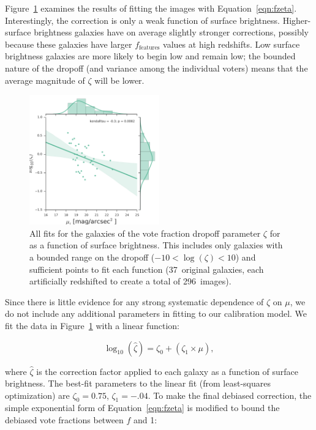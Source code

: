 \documentclass[twocolumn]{aastex6}
\begin{document}
Figure~\ref{fig:zeta_mu} examines the results of fitting the \ferengi{} images
with Equation~\ref{eqn:fzeta}. Interestingly, the correction is only a weak
function of surface brightness. Higher-surface brightness galaxies have on
average slightly stronger corrections, possibly because these galaxies have
larger $f_\textrm{features}$ values at high redshifts. Low surface brightness
galaxies are more likely to begin low and remain low; the bounded nature of the
dropoff (and variance among the individual voters) means that the average
magnitude of $\zeta$ will be lower. 

\begin{figure}
\center
\includegraphics[width=0.50\textwidth]{figures/zeta_mu.pdf}
\caption{All fits for the \ferengi{} galaxies of the vote fraction dropoff
parameter $\zeta$ for \ffeatures{} as a function of surface brightness. This
includes only galaxies with a bounded range on the dropoff
($-10<\log(\zeta)<10$) and sufficient points to fit each function (37~original
galaxies, each artificially redshifted to create a total of 296~images).}
\label{fig:zeta_mu}
\end{figure}

Since there is little evidence for any strong systematic dependence of $\zeta$
on $\mu$, we do not include any additional parameters in fitting to our
calibration model.  We fit the data in Figure~\ref{fig:zeta_mu} with a linear
function:

\begin{equation}
\log_{10}(\hat\zeta) = \zeta_0 + (\zeta_1 \times \mu),
\label{eqn:zetafit}
\end{equation}

\noindent where $\hat\zeta$ is the correction factor applied to each galaxy as
a function of surface brightness. The best-fit parameters to the linear fit
(from least-squares optimization) are $\zeta_0=0.75$, $\zeta_1=-.04$. To make the
final debiased correction, the simple exponential form of
Equation~\ref{eqn:fzeta} is modified to bound the debiased vote fractions
between $f$ and 1:
\end{document}
